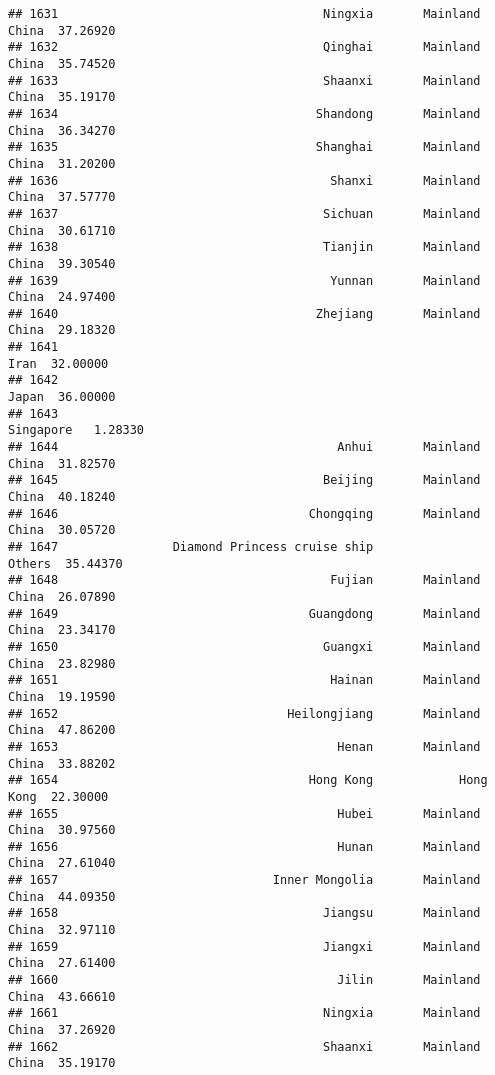 \documentclass[
]{article}
\begin{document}
\begin{verbatim}
## 1631                                     Ningxia       Mainland China  37.26920
## 1632                                     Qinghai       Mainland China  35.74520
## 1633                                     Shaanxi       Mainland China  35.19170
## 1634                                    Shandong       Mainland China  36.34270
## 1635                                    Shanghai       Mainland China  31.20200
## 1636                                      Shanxi       Mainland China  37.57770
## 1637                                     Sichuan       Mainland China  30.61710
## 1638                                     Tianjin       Mainland China  39.30540
## 1639                                      Yunnan       Mainland China  24.97400
## 1640                                    Zhejiang       Mainland China  29.18320
## 1641                                                             Iran  32.00000
## 1642                                                            Japan  36.00000
## 1643                                                        Singapore   1.28330
## 1644                                       Anhui       Mainland China  31.82570
## 1645                                     Beijing       Mainland China  40.18240
## 1646                                   Chongqing       Mainland China  30.05720
## 1647                Diamond Princess cruise ship               Others  35.44370
## 1648                                      Fujian       Mainland China  26.07890
## 1649                                   Guangdong       Mainland China  23.34170
## 1650                                     Guangxi       Mainland China  23.82980
## 1651                                      Hainan       Mainland China  19.19590
## 1652                                Heilongjiang       Mainland China  47.86200
## 1653                                       Henan       Mainland China  33.88202
## 1654                                   Hong Kong            Hong Kong  22.30000
## 1655                                       Hubei       Mainland China  30.97560
## 1656                                       Hunan       Mainland China  27.61040
## 1657                              Inner Mongolia       Mainland China  44.09350
## 1658                                     Jiangsu       Mainland China  32.97110
## 1659                                     Jiangxi       Mainland China  27.61400
## 1660                                       Jilin       Mainland China  43.66610
## 1661                                     Ningxia       Mainland China  37.26920
## 1662                                     Shaanxi       Mainland China  35.19170

\end{verbatim}
\end{document}
